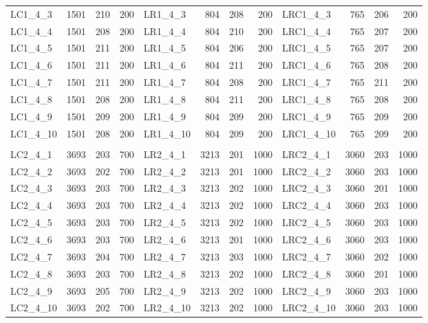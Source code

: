 \documentclass{anpet}
\begin{document}
\begin{table}[H]
\begin{tabular}{lrrr|lrrr|lrrr}
        LC1\_4\_3  & 1501 & 210 & 200 & LR1\_4\_3  &  804 & 208 &  200 & LRC1\_4\_3  &  765 & 206 &  200\\
        LC1\_4\_4  & 1501 & 208 & 200 & LR1\_4\_4  &  804 & 210 &  200 & LRC1\_4\_4  &  765 & 207 &  200\\
        LC1\_4\_5  & 1501 & 211 & 200 & LR1\_4\_5  &  804 & 206 &  200 & LRC1\_4\_5  &  765 & 207 &  200\\
        LC1\_4\_6  & 1501 & 211 & 200 & LR1\_4\_6  &  804 & 211 &  200 & LRC1\_4\_6  &  765 & 208 &  200\\
        LC1\_4\_7  & 1501 & 211 & 200 & LR1\_4\_7  &  804 & 208 &  200 & LRC1\_4\_7  &  765 & 211 &  200\\
        LC1\_4\_8  & 1501 & 208 & 200 & LR1\_4\_8  &  804 & 211 &  200 & LRC1\_4\_8  &  765 & 208 &  200\\
        LC1\_4\_9  & 1501 & 209 & 200 & LR1\_4\_9  &  804 & 209 &  200 & LRC1\_4\_9  &  765 & 209 &  200\\
        LC1\_4\_10 & 1501 & 208 & 200 & LR1\_4\_10 &  804 & 209 &  200 & LRC1\_4\_10 &  765 & 209 &  200\\
                   &      &     &     &            &      &     &      &             &      &     &     \\
        LC2\_4\_1  & 3693 & 203 & 700 & LR2\_4\_1  & 3213 & 201 & 1000 & LRC2\_4\_1  & 3060 & 203 & 1000\\
        LC2\_4\_2  & 3693 & 202 & 700 & LR2\_4\_2  & 3213 & 201 & 1000 & LRC2\_4\_2  & 3060 & 203 & 1000\\
        LC2\_4\_3  & 3693 & 203 & 700 & LR2\_4\_3  & 3213 & 202 & 1000 & LRC2\_4\_3  & 3060 & 201 & 1000\\
        LC2\_4\_4  & 3693 & 203 & 700 & LR2\_4\_4  & 3213 & 202 & 1000 & LRC2\_4\_4  & 3060 & 203 & 1000\\
        LC2\_4\_5  & 3693 & 203 & 700 & LR2\_4\_5  & 3213 & 202 & 1000 & LRC2\_4\_5  & 3060 & 203 & 1000\\
        LC2\_4\_6  & 3693 & 203 & 700 & LR2\_4\_6  & 3213 & 201 & 1000 & LRC2\_4\_6  & 3060 & 203 & 1000\\
        LC2\_4\_7  & 3693 & 204 & 700 & LR2\_4\_7  & 3213 & 203 & 1000 & LRC2\_4\_7  & 3060 & 202 & 1000\\
        LC2\_4\_8  & 3693 & 203 & 700 & LR2\_4\_8  & 3213 & 202 & 1000 & LRC2\_4\_8  & 3060 & 201 & 1000\\
        LC2\_4\_9  & 3693 & 205 & 700 & LR2\_4\_9  & 3213 & 202 & 1000 & LRC2\_4\_9  & 3060 & 203 & 1000\\
        LC2\_4\_10 & 3693 & 202 & 700 & LR2\_4\_10 & 3213 & 202 & 1000 & LRC2\_4\_10 & 3060 & 203 & 1000\\
        \bottomrule
    \end{tabular}
\end{table}
\end{document}
